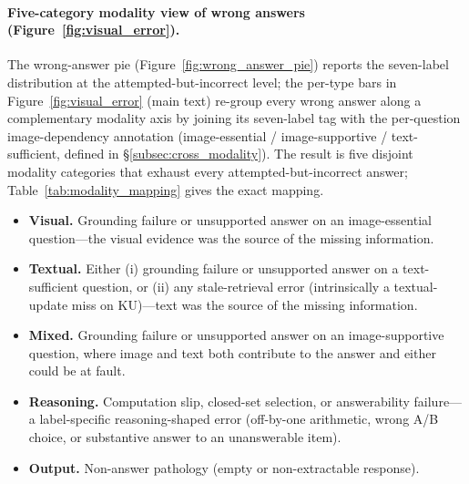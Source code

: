 \documentclass{article}
\begin{document}
\paragraph{Five-category modality view of wrong answers (Figure~\ref{fig:visual_error}).}
The wrong-answer pie (Figure~\ref{fig:wrong_answer_pie}) reports the seven-label distribution at the
attempted-but-incorrect level; the per-type bars in Figure~\ref{fig:visual_error} (main text) re-group every
wrong answer along a complementary modality axis by joining its seven-label tag with the per-question
image-dependency annotation (image-essential / image-supportive / text-sufficient, defined in
\S\ref{subsec:cross_modality}). The result is five disjoint modality categories that exhaust every
attempted-but-incorrect answer; Table~\ref{tab:modality_mapping} gives the exact mapping.
\begin{itemize}[leftmargin=1.2em,topsep=2pt,itemsep=2pt]
\item \textbf{Visual.} Grounding failure or unsupported answer on an image-essential question---the visual evidence was the source of the missing information.
\item \textbf{Textual.} Either (i) grounding failure or unsupported answer on a text-sufficient question, or (ii) any stale-retrieval error (intrinsically a textual-update miss on KU)---text was the source of the missing information.
\item \textbf{Mixed.} Grounding failure or unsupported answer on an image-supportive question, where image and text both contribute to the answer and either could be at fault.
\item \textbf{Reasoning.} Computation slip, closed-set selection, or answerability failure---a label-specific reasoning-shaped error (off-by-one arithmetic, wrong A/B choice, or substantive answer to an unanswerable item).
\item \textbf{Output.} Non-answer pathology (empty or non-extractable response).
\end{itemize}
\end{document}
